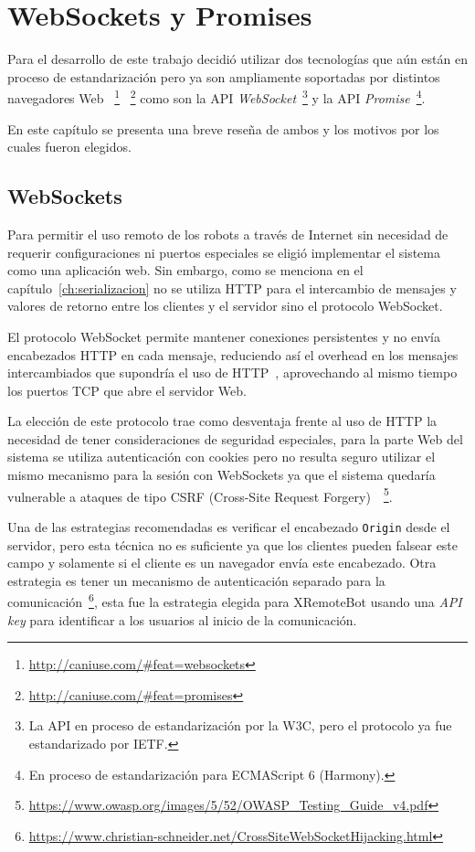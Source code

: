 \chapter{WebSockets y Promises}\label{ch:websockets_y_promises}

Para el desarrollo de este trabajo decidió utilizar dos tecnologías
que aún están en proceso de estandarización pero ya son ampliamente
soportadas por distintos navegadores
Web%
~\footnote{\url{http://caniuse.com/\#feat=websockets}}%
~\footnote{\url{http://caniuse.com/\#feat=promises}}
como son la API
\textit{WebSocket}~\footnote{La API en proceso de estandarización por la W3C,
pero el protocolo ya fue estandarizado por IETF.}
y la API \textit{Promise}~\footnote{En proceso de estandarización para
ECMAScript 6 (Harmony).}.

En este capítulo se presenta una breve reseña de ambos y los motivos
por los cuales fueron elegidos.

\section{WebSockets}

Para permitir el uso remoto de los robots a través de Internet sin necesidad
de requerir configuraciones ni puertos especiales se eligió implementar el
sistema como una
aplicación web. Sin embargo, como se menciona en el
capítulo~\ref{ch:serializacion} no se utiliza HTTP para el intercambio de
mensajes y valores de retorno entre los clientes y el servidor sino el
protocolo WebSocket.

El protocolo WebSocket permite mantener conexiones persistentes y no envía
encabezados HTTP en cada mensaje, reduciendo así el overhead en los mensajes
intercambiados que supondría el uso de HTTP~\citep{wang_2013}, aprovechando al
mismo tiempo los puertos TCP que abre el servidor Web.

La elección de este protocolo trae como desventaja frente al uso de HTTP la
necesidad de tener consideraciones de seguridad especiales, para la parte
Web del sistema se utiliza autenticación con cookies pero no resulta seguro
utilizar el mismo mecanismo para la sesión con WebSockets ya que el sistema
quedaría vulnerable a ataques de tipo CSRF (Cross-Site Request
Forgery)~\citep{owasp_2014}~\footnote{
\url{https://www.owasp.org/images/5/52/OWASP_Testing_Guide_v4.pdf}}.

Una de las estrategias recomendadas es verificar el encabezado \texttt{Origin}
desde el servidor, pero esta técnica no es suficiente ya que los
clientes pueden falsear este campo y solamente si el cliente es un navegador
envía este encabezado.
Otra estrategia es tener un mecanismo de autenticación
separado para la comunicación~\footnote{\url{https://www.christian-schneider.net/CrossSiteWebSocketHijacking.html}},
esta fue la estrategia elegida para XRemoteBot usando una \textit{API key}
para identificar a los usuarios al inicio de la comunicación.

